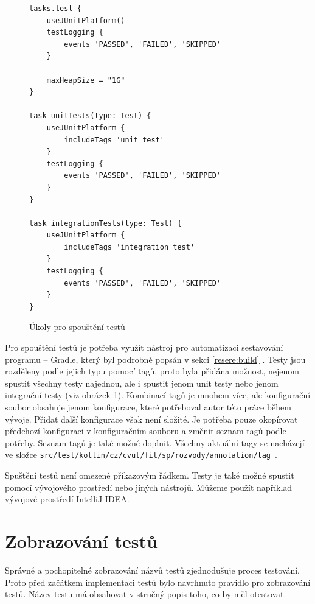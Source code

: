     \begin{figure}
        \begin{verbatim}
tasks.test {
    useJUnitPlatform()
    testLogging {
        events 'PASSED', 'FAILED', 'SKIPPED'
    }

    maxHeapSize = "1G"
}

task unitTests(type: Test) {
    useJUnitPlatform {
        includeTags 'unit_test'
    }
    testLogging {
        events 'PASSED', 'FAILED', 'SKIPPED'
    }
}

task integrationTests(type: Test) {
    useJUnitPlatform {
        includeTags 'integration_test'
    }
    testLogging {
        events 'PASSED', 'FAILED', 'SKIPPED'
    }
}
        \end{verbatim}
        \caption{Úkoly pro spouštění testů} 
        \label{code:gradle-tests}
    \end{figure}
    Pro spouštění testů je potřeba využít nástroj pro automatizaci sestavování programu -- Gradle, který byl podrobně popsán v sekci \ref{resere:build} . Testy jsou rozděleny podle jejich typu pomocí tagů, proto byla přidána možnost, nejenom spustit všechny testy najednou, ale i spustit jenom unit testy nebo jenom integrační testy (viz obrázek \ref{code:gradle-tests}). Kombinací tagů je mnohem více, ale konfigurační soubor obsahuje jenom konfigurace, které potřeboval autor této práce během vývoje. 
    Přidat další konfigurace však není složité. Je potřeba pouze okopírovat předchozí konfiguraci v konfiguračním souboru a změnit seznam tagů podle potřeby. Seznam tagů je také možné doplnit. Všechny aktuální tagy se nacházejí ve složce \verb|src/test/kotlin/cz/cvut/fit/sp/rozvody/annotation/tag|~.
    
    Spuštění testů není omezené příkazovým řádkem. Testy je také možné spustit pomocí vývojového prostředí nebo jiných nástrojů. Můžeme použít například vývojové prostředí IntelliJ IDEA. 
\section{Zobrazování testů}\label{testovani:zobrazovani}
    Správné a pochopitelné zobrazování názvů testů zjednodušuje proces testování. Proto před začátkem implementaci testů bylo navrhnuto pravidlo pro zobrazování testů. Název testu má obsahovat v stručný popis toho, co by měl otestovat. 
    
